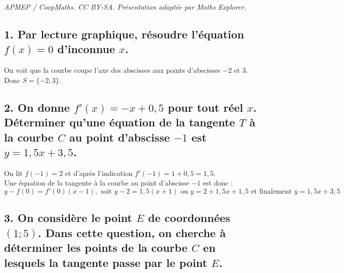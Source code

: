 \documentclass[10pt]{article}
\begin{document}
\noindent\textit{APMEP / CoopMaths. CC BY-SA. Présentation adaptée par Maths Explorer.}\par\medskip
{}
	
	\subsection*{1. Par lecture graphique, résoudre l'équation $f(x) = 0$ d'inconnue $x$.}
	
On voit que la courbe coupe l'axe des abscisses aux points d'abscisses $-2$ et $3$. \\
	Donc $S = \{-2; 3\}$.
	
	\subsection*{2. On donne $f'(x) = -x + 0,5$ pour tout réel $x$. Déterminer qu'une équation de la tangente $T$ à la courbe $C$ au point d'abscisse $-1$ est $y = 1,5x + 3,5$.}
	
On lit $f(-1) = 2$ et d'après l'indication $f'(-1) = 1 + 0,5 = 1,5$.\\
Une équation de la tangente à la courbe au point d'abscisse $-1$ est donc :
	\[
	y - f(0) = f'(0)(x - 1), \text{ soit } y - 2 = 1,5(x + 1) \text{ ou } y = 2 + 1,5x + 1,5 \text{ et finalement } y = 1,5x + 3,5
	\]
	
	\subsection*{3. On considère le point $E$ de coordonnées $(1; 5)$. Dans cette question, on cherche à déterminer les points de la courbe $C$ en lesquels la tangente passe par le point $E$.}
	
\end{document}
